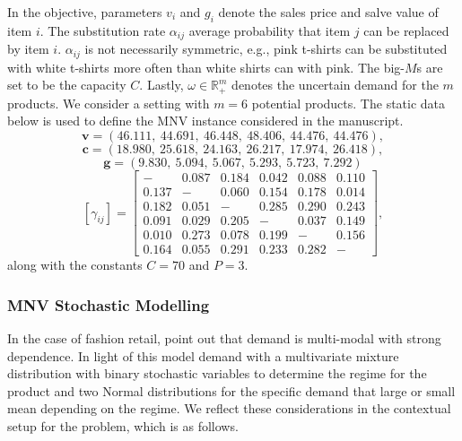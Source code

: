  In the objective, parameters $v_i$ and $g_i$ denote the sales price and salve value of item $i$. The substitution rate $\alpha_{ij}$ average probability that item $j$ can be replaced by item $i$. $\alpha_{ij}$ is not necessarily symmetric, e.g., pink t-shirts can be substituted with white t-shirts more often than white shirts can with pink. The big-$M$s are set to be the capacity $C$. Lastly, $\omega \in \mathbb{R}^m_+$ denotes the uncertain demand for the $m$ products. We consider a setting with $m = 6$ potential products. The static data below is used to define the MNV instance considered in the manuscript. 
\[
\boldsymbol{v} = \left( 
46.111, \ 
44.691, \ 
46.448, \ 
48.406, \ 
44.476, \ 
44.476 
\right), 
\]
\[
\boldsymbol{c} = \left( 
18.980, \ 
25.618, \ 
24.163, \ 
26.217, \ 
17.974, \ 
26.418 
\right),
\]
\[
\boldsymbol{g} = \left( 
9.830, \ 
5.094, \ 
5.067, \ 
5.293, \ 
5.723, \ 
7.292 
\right)
\]
\[
[\gamma_{ij}] = \begin{bmatrix}
- & 0.087 & 0.184 & 0.042 & 0.088 & 0.110 \\
0.137 & - & 0.060 & 0.154 & 0.178 & 0.014 \\
0.182 & 0.051 & - & 0.285 & 0.290 & 0.243 \\
0.091 & 0.029 & 0.205 & - & 0.037 & 0.149 \\
0.010 & 0.273 & 0.078 & 0.199 & - & 0.156 \\
0.164 & 0.055 & 0.291 & 0.233 & 0.282 & -
\end{bmatrix},
\]
along with the constants $C = 70$ and  $P = 3$.

\subsubsection{MNV Stochastic Modelling}\label{appendix:MNV_data}

In the case of fashion retail, \citet{vaagen2011modelling} point out that demand is multi-modal with strong dependence. In light of this \citet{narum2024problem} model demand with a multivariate mixture distribution with binary stochastic variables to determine the regime for the product and two Normal distributions for the specific demand that large or small mean depending on the regime. We reflect these considerations in the contextual setup for the problem, which is as follows. 


